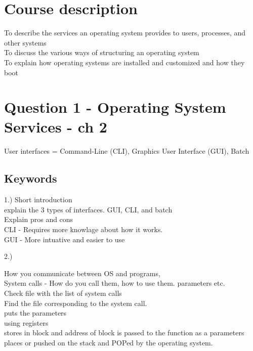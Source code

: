 \documentclass[a4paper,10pt,titlepage]{report}
\date{}
\begin{document}
\renewcommand{\thepage}{\roman{page}}%
\tableofcontents
\newpage
\setcounter{page}{1}
\renewcommand{\thepage}{\arabic{page}}
\section{Course description}
To describe the services an operating system provides to
users, processes, and other systems\\
To discuss the various ways of structuring an operating
system\\
To explain how operating systems are installed and
customized and how they boot\\
\newpage
\section{Question 1 - Operating System Services - ch 2}
User interfaces = Command-Line (CLI), Graphics User Interface (GUI), Batch \\


\subsection{Keywords}
1.) Short introduction \\
\hspace{10mm}explain the 3 types of interfaces. GUI, CLI, and batch\\
\hspace{15mm}Explain pros and cons\\
\hspace{20mm}CLI - Requires more knowlage about how it works. \\
\hspace{20mm}GUI - More intuative and easier to use \\
\vspace{5mm}


2.)

How you communicate between OS and programs,\\
\hspace{10mm}System calls - How do you call them, how to use them. parameters etc. \\
\hspace{15mm} Check file with the list of system calls \\
\hspace{15mm} Find the file corresponding to the system call.\\
\hspace{15mm} puts the parameters\\
\hspace{20mm} using registers\\
\hspace{20mm} stores in block and address of block is passed to the function as a parameters\\
\hspace{20mm} places or pushed on the stack and POPed by the operating system.\\
\vspace{5mm}
\end{document}
